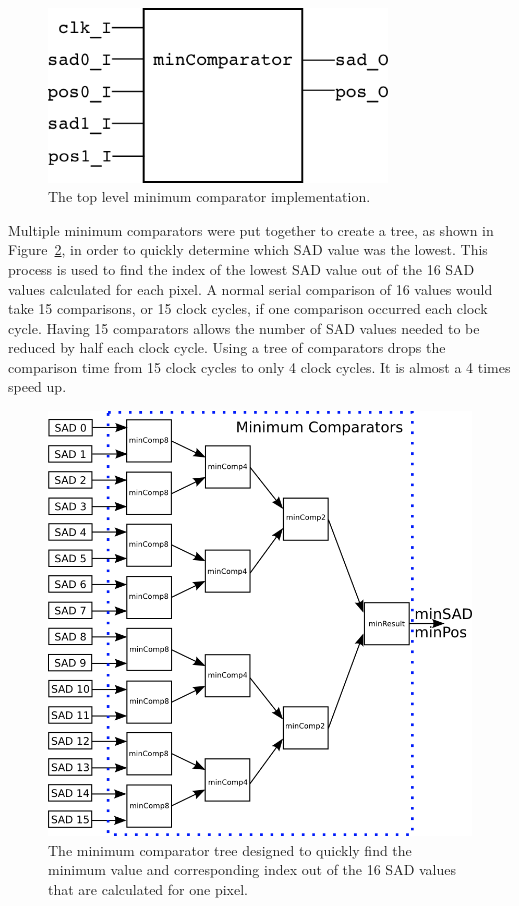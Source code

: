 \begin{figure}
	\begin{center}
		\includegraphics[width=90mm]{figures/minComparator_rtl.png}
		\captionfonts
		\caption{The top level minimum comparator implementation.}
		\label{fig:minComp_rtl}
	\end{center}
\end{figure}

Multiple minimum comparators were put together to create a tree, as shown in Figure~\ref{fig:minComp}, in order to quickly determine which SAD value was the lowest. This process is used to find the index of the lowest SAD value out of the 16 SAD values calculated for each pixel. A normal serial comparison of 16 values would take 15 comparisons, or 15 clock cycles, if one comparison occurred each clock cycle. Having 15 comparators allows the number of SAD values needed to be reduced by half each clock cycle. Using a tree of comparators drops the comparison time from 15 clock cycles to only 4 clock cycles. It is almost a 4 times speed up.

\begin{figure}
	\begin{center}
		\includegraphics[width=150mm]{figures/minComparator.png}
		\captionfonts
		\caption{The minimum comparator tree designed to quickly find the minimum value and corresponding index out of the 16 SAD values that are calculated for one pixel.}
		\label{fig:minComp}
	\end{center}
\end{figure}

